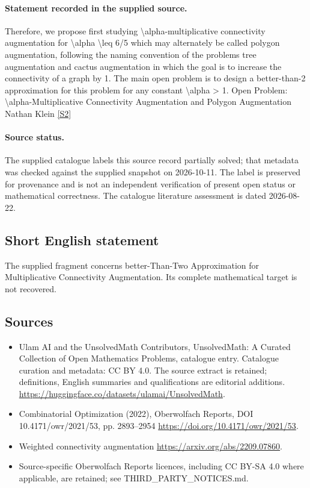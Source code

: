 \documentclass[11pt]{article}
\newcommand{\sref}[2]{\hyperlink{source:#1:#2}{[S#2]}}
\begin{document}
\paragraph{Statement recorded in the supplied source.}
Therefore, we propose first studying \textbackslash{}alpha-multiplicative connectivity augmentation for \textbackslash{}alpha \textbackslash{}leq 6/5 which may alternately be called polygon augmentation, following the naming convention of the problems tree augmentation and cactus augmentation in which the goal is to increase the connectivity of a graph by 1. The main open problem is to design a better-than-2 approximation for this problem for any constant \textbackslash{}alpha > 1. Open Problem: \textbackslash{}alpha-Multiplicative Connectivity Augmentation and Polygon Augmentation Nathan Klein \sref{statement}{2}
\paragraph{Source status.}
The supplied catalogue labels this source record partially solved; that metadata was checked against the supplied snapshot on 2026-10-11. The label is preserved for provenance and is not an independent verification of present open status or mathematical correctness. The catalogue literature assessment is dated 2026-08-22.
\subsection{Short English statement}
The supplied fragment concerns better-Than-Two Approximation for Multiplicative Connectivity Augmentation. Its complete mathematical target is not recovered.
\subsection{Sources}
\begin{itemize}
\item[\hypertarget{source:statement:1}{S1}] Ulam AI and the UnsolvedMath Contributors, UnsolvedMath: A Curated Collection of Open Mathematics Problems, catalogue entry. Catalogue curation and metadata: CC BY 4.0. The source extract is retained; definitions, English summaries and qualifications are editorial additions.
\url{https://huggingface.co/datasets/ulamai/UnsolvedMath}.
\item[\hypertarget{source:statement:2}{S2}] Combinatorial Optimization (2022), Oberwolfach Reports, DOI 10.4171/owr/2021/53, pp. 2893--2954
\url{https://doi.org/10.4171/owr/2021/53}.
\item[\hypertarget{source:statement:3}{S3}] Weighted connectivity augmentation
\url{https://arxiv.org/abs/2209.07860}.
\item Source-specific Oberwolfach Reports licences, including CC BY-SA 4.0 where applicable, are retained; see THIRD\_PARTY\_NOTICES.md.
\end{itemize}
\end{document}
